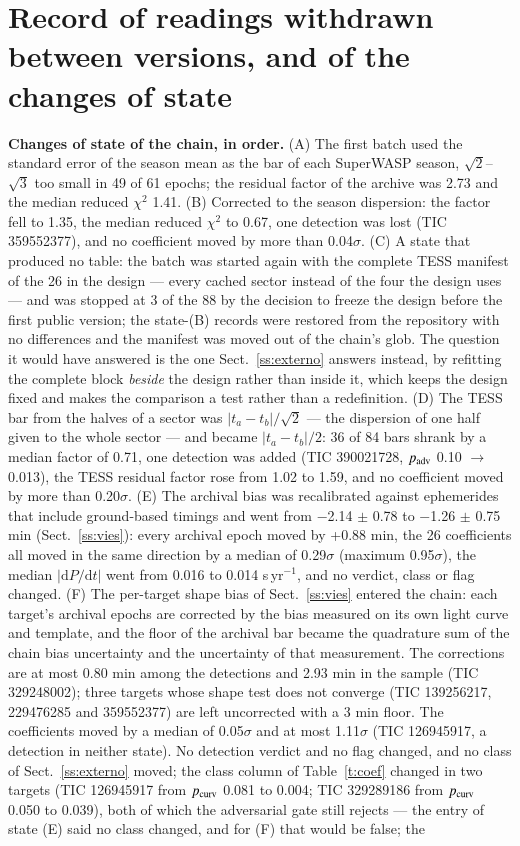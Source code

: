 \documentclass{aa}
\begin{document}
\section{Record of readings withdrawn between versions, and of the changes of state}\label{a:C}
\textbf{Changes of state of the chain, in order.} (A) The first batch used the standard error of the season mean as the bar of each SuperWASP season, $\sqrt{2}$--$\sqrt{3}$ too small in 49 of 61 epochs; the residual factor of the archive was 2.73 and the median reduced $\chi^2$ 1.41. (B) Corrected to the season dispersion: the factor fell to 1.35, the median reduced $\chi^2$ to 0.67, one detection was lost (TIC 359552377), and no coefficient moved by more than 0.04$\sigma$. (C) A state that produced no table: the batch was started again with the complete TESS manifest of the 26 in the design --- every cached sector instead of the four the design uses --- and was stopped at 3 of the 88 by the decision to freeze the design before the first public version; the state-(B) records were restored from the repository with no differences and the manifest was moved out of the chain's glob. The question it would have answered is the one Sect.~\ref{ss:externo} answers instead, by refitting the complete block \textit{beside} the design rather than inside it, which keeps the design fixed and makes the comparison a test rather than a redefinition. (D) The TESS bar from the halves of a sector was $|t_a - t_b|/\sqrt{2}$ --- the dispersion of one half given to the whole sector --- and became $|t_a - t_b|/2$: 36 of 84 bars shrank by a median factor of 0.71, one detection was added (TIC 390021728, $p_{\rm adv}$ 0.10 $\rightarrow$ 0.013), the TESS residual factor rose from 1.02 to 1.59, and no coefficient moved by more than 0.20$\sigma$. (E) The archival bias was recalibrated against ephemerides that include ground-based timings and went from $-$2.14 $\pm$ 0.78 to $-$1.26 $\pm$ 0.75 min (Sect.~\ref{ss:vies}): every archival epoch moved by +0.88 min, the 26 coefficients all moved in the same direction by a median of 0.29$\sigma$ (maximum 0.95$\sigma$), the median $|\mathrm{d}P/\mathrm{d}t|$ went from 0.016 to 0.014 s\,yr$^{-1}$, and no verdict, class or flag changed. (F) The per-target shape bias of Sect.~\ref{ss:vies} entered the chain: each target's archival epochs are corrected by the bias measured on its own light curve and template, and the floor of the archival bar became the quadrature sum of the chain bias uncertainty and the uncertainty of that measurement. The corrections are at most 0.80 min among the detections and 2.93 min in the sample (TIC 329248002); three targets whose shape test does not converge (TIC 139256217, 229476285 and 359552377) are left uncorrected with a 3 min floor. The coefficients moved by a median of 0.05$\sigma$ and at most 1.11$\sigma$ (TIC 126945917, a detection in neither state). No detection verdict and no flag changed, and no class of Sect.~\ref{ss:externo} moved; the class column of Table~\ref{t:coef} changed in two targets (TIC 126945917 from $p_{\rm curv}$ 0.081 to 0.004; TIC 329289186 from $p_{\rm curv}$ 0.050 to 0.039), both of which the adversarial gate still rejects --- the entry of state (E) said no class changed, and for (F) that would be false; the 
\end{document}
